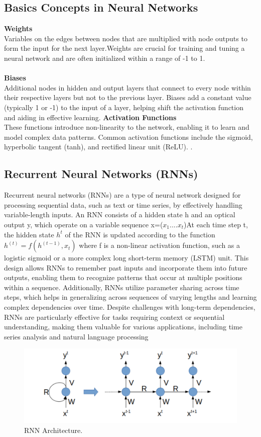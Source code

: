 \subsection{Basics Concepts in Neural Networks}
\textbf{Weights} \\
Variables on the edges between nodes that are multiplied with node outputs to form the input for the next layer.Weights are crucial for training and tuning a neural network and are often initialized within a range of -1 to 1.  \\ \\ 
\textbf{Biases} \\
Additional nodes in hidden and output layers that connect to every node within their respective layers but not to the previous layer. Biases add a constant value (typically 1 or -1) to the input of a layer, helping shift the activation function and aiding in effective learning. 
\textbf{Activation Functions} \\
These functions introduce non-linearity to the network, enabling it to learn and model complex data patterns. Common activation functions include the sigmoid, hyperbolic tangent (tanh), and rectified linear unit (ReLU). \cite{taylor2017neural}.

\subsection{ Recurrent Neural Networks (RNNs)}
Recurrent neural networks (RNNs) are a type of neural network designed for processing sequential data, such as text or time series, by effectively handling variable-length inputs. An RNN consists of a hidden state h and an optical output y, which operate on a variable  sequence x=($x_1$....$x_t$)At each time step t, the hidden state $h^t$
of the RNN is updated according to the function $h^{(t)} = f(h^{(t-1)}, x_t)$
where f is a non-linear activation function, such as a logistic sigmoid or a more complex long short-term memory (LSTM) unit. This design allows RNNs to remember past inputs and incorporate them into future outputs, enabling them to recognize patterns that occur at multiple positions within a sequence. Additionally, RNNs utilize parameter sharing across time steps, which helps in generalizing across sequences of varying lengths and learning complex dependencies over time. Despite challenges with long-term dependencies, RNNs are particularly effective for tasks requiring context or sequential understanding, making them valuable for various applications, including time series analysis and natural language processing\cite{cho2014learning} 
\begin{figure}[htbp]
	
	\centerline{\includegraphics[width=1\linewidth]{Figures/RNN.png}}
	\caption{RNN Architecture.}
	\label{RNN.png}
\end{figure}
